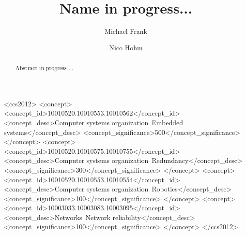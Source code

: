 \documentclass[sigconf]{acmart}
\begin{document}
\title{Name in progress... }

\author{Michael Frank}

\author{Nico Hohm}

\begin{abstract}
  Abstract in progress ...
\end{abstract}

\begin{CCSXML}
<ccs2012>
 <concept>
  <concept_id>10010520.10010553.10010562</concept_id>
  <concept_desc>Computer systems organization~Embedded systems</concept_desc>
  <concept_significance>500</concept_significance>
 </concept>
 <concept>
  <concept_id>10010520.10010575.10010755</concept_id>
  <concept_desc>Computer systems organization~Redundancy</concept_desc>
  <concept_significance>300</concept_significance>
 </concept>
 <concept>
  <concept_id>10010520.10010553.10010554</concept_id>
  <concept_desc>Computer systems organization~Robotics</concept_desc>
  <concept_significance>100</concept_significance>
 </concept>
 <concept>
  <concept_id>10003033.10003083.10003095</concept_id>
  <concept_desc>Networks~Network reliability</concept_desc>
  <concept_significance>100</concept_significance>
 </concept>
</ccs2012>
\end{CCSXML}


\maketitle
\pagestyle{plain}
\end{document}
